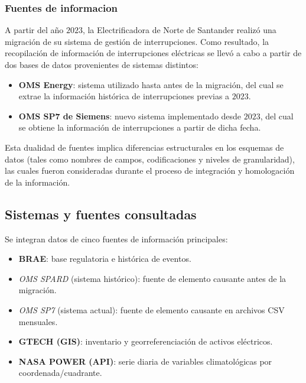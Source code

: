 \subsubsection{Fuentes de informacion}
A partir del año $2023$, la Electrificadora de Norte de Santander realizó una migración de su sistema de gestión de interrupciones. Como resultado, la recopilación de información de interrupciones eléctricas se llevó a cabo a partir de dos bases de datos provenientes de sistemas distintos:

\begin{itemize}
\item \textbf{OMS Energy}: sistema utilizado hasta antes de la migración, del cual se extrae la información histórica de interrupciones previas a $2023$.
        
\item \textbf{OMS SP7 de Siemens}: nuevo sistema implementado desde $2023$, del cual se obtiene la información de interrupciones a partir de dicha fecha.
\end{itemize}

Esta dualidad de fuentes implica diferencias estructurales en los esquemas de datos (tales como nombres de campos, codificaciones y niveles de granularidad), las cuales fueron consideradas durante el proceso de integración y homologación de la información.


\subsection{Sistemas y fuentes consultadas}
Se integran datos de cinco fuentes de información principales:

\begin{itemize}
        \item \textbf{BRAE}: base regulatoria e histórica de eventos.
        
        \item \textit{OMS SPARD} (sistema histórico): fuente de elemento causante antes de la migración.
        
        \item \textit{OMS SP7} (sistema actual): fuente de elemento causante en archivos CSV mensuales.
        
        \item \textbf{GTECH (GIS)}: inventario y georreferenciación de activos eléctricos.
        
        \item \textbf{NASA POWER (API)}: serie diaria de variables climatológicas por coordenada/cuadrante.
\end{itemize}


